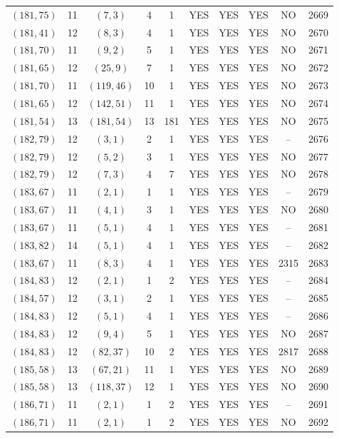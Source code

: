 \begin{longtable}{|c|c|c|c|c|c|c|c|c|c|}
$(181, 75)$ & 11 & $(7, 3)$ & 4 & 1 & YES & YES & YES & NO & 2669\\
$(181, 41)$ & 12 & $(8, 3)$ & 4 & 1 & YES & YES & YES & NO & 2670\\
$(181, 70)$ & 11 & $(9, 2)$ & 5 & 1 & YES & YES & YES & NO & 2671\\
$(181, 65)$ & 12 & $(25, 9)$ & 7 & 1 & YES & YES & YES & NO & 2672\\
$(181, 70)$ & 11 & $(119, 46)$ & 10 & 1 & YES & YES & YES & NO & 2673\\
$(181, 65)$ & 12 & $(142, 51)$ & 11 & 1 & YES & YES & YES & NO & 2674\\
$(181, 54)$ & 13 & $(181, 54)$ & 13 & 181 & YES & YES & YES & NO & 2675\\
$(182, 79)$ & 12 & $(3, 1)$ & 2 & 1 & YES & YES & YES & -- & 2676\\
$(182, 79)$ & 12 & $(5, 2)$ & 3 & 1 & YES & YES & YES & NO & 2677\\
$(182, 79)$ & 12 & $(7, 3)$ & 4 & 7 & YES & YES & YES & NO & 2678\\
$(183, 67)$ & 11 & $(2, 1)$ & 1 & 1 & YES & YES & YES & -- & 2679\\
$(183, 67)$ & 11 & $(4, 1)$ & 3 & 1 & YES & YES & YES & NO & 2680\\
$(183, 67)$ & 11 & $(5, 1)$ & 4 & 1 & YES & YES & YES & -- & 2681\\
$(183, 82)$ & 14 & $(5, 1)$ & 4 & 1 & YES & YES & YES & -- & 2682\\
$(183, 67)$ & 11 & $(8, 3)$ & 4 & 1 & YES & YES & YES & 2315 & 2683\\
$(184, 83)$ & 12 & $(2, 1)$ & 1 & 2 & YES & YES & YES & -- & 2684\\
$(184, 57)$ & 12 & $(3, 1)$ & 2 & 1 & YES & YES & YES & -- & 2685\\
$(184, 83)$ & 12 & $(5, 1)$ & 4 & 1 & YES & YES & YES & -- & 2686\\
$(184, 83)$ & 12 & $(9, 4)$ & 5 & 1 & YES & YES & YES & NO & 2687\\
$(184, 83)$ & 12 & $(82, 37)$ & 10 & 2 & YES & YES & YES & 2817 & 2688\\
$(185, 58)$ & 13 & $(67, 21)$ & 11 & 1 & YES & YES & YES & NO & 2689\\
$(185, 58)$ & 13 & $(118, 37)$ & 12 & 1 & YES & YES & YES & NO & 2690\\
$(186, 71)$ & 11 & $(2, 1)$ & 1 & 2 & YES & YES & YES & -- & 2691\\
$(186, 71)$ & 11 & $(2, 1)$ & 1 & 2 & YES & YES & YES & NO & 2692\\

\end{longtable}
